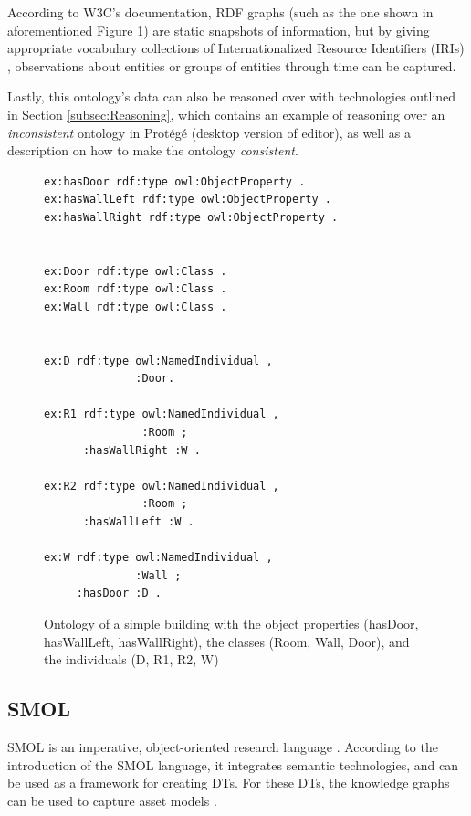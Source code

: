 \documentclass{article}
\begin{document}
According to W3C's documentation, RDF graphs (such as the one shown in aforementioned Figure \ref{fig:building_ontology}) are static snapshots of information, but by giving appropriate vocabulary collections of Internationalized Resource Identifiers (IRIs) \cite{noauthor_rdf_nodate}, observations about entities or groups of entities through time can be captured.

Lastly, this ontology's data can also be reasoned over with technologies outlined in Section \ref{subsec:Reasoning}, which contains an example of reasoning over an \emph{inconsistent} ontology in Protégé (desktop version of editor), as well as a description on how to make the ontology \emph{consistent}.


\begin{figure}[H]
    \centering
    \caption{Ontology of a simple building with the object properties (hasDoor, hasWallLeft, hasWallRight), the classes (Room, Wall, Door), and the individuals (D, R1, R2, W)}
    \label{fig:building_ontology}
    \begin{Verbatim}[frame=single]
ex:hasDoor rdf:type owl:ObjectProperty .
ex:hasWallLeft rdf:type owl:ObjectProperty .
ex:hasWallRight rdf:type owl:ObjectProperty .

        
ex:Door rdf:type owl:Class .
ex:Room rdf:type owl:Class .
ex:Wall rdf:type owl:Class .

        
ex:D rdf:type owl:NamedIndividual ,
              :Door.
            
ex:R1 rdf:type owl:NamedIndividual ,
               :Room ;
      :hasWallRight :W .
    
ex:R2 rdf:type owl:NamedIndividual ,
               :Room ;
      :hasWallLeft :W .
    
ex:W rdf:type owl:NamedIndividual ,
              :Wall ;
     :hasDoor :D .
    \end{Verbatim}
\end{figure}

\subsection{SMOL}\label{subsec:SMOL}
SMOL is an imperative, object-oriented research language \cite{noauthor_smol_nodate-1}. According to the introduction of the SMOL language, it integrates semantic technologies, and can be used as a framework for creating DTs. For these DTs, the knowledge graphs can be used to capture asset models \cite{noauthor_introduction_nodate}.
\end{document}
